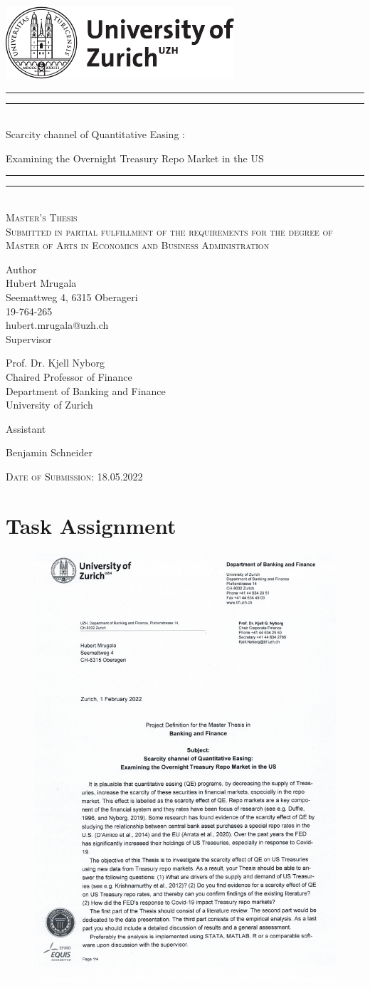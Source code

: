 \documentclass[11pt,a4paper,english,oneside]{book}
\makeatletter
\newcommand*{\plogo}{\includegraphics{./style/uzh_logo_e_pos}}
\numberwithin{equation}{chapter}
\newcommand*{\titleGP}{\begingroup %
\centering %
\vspace*{\baselineskip} %
\plogo\\[2\baselineskip] %
\rule{\textwidth}{1.6pt}\vspace*{-\baselineskip}\vspace*{2pt} %
\rule{\textwidth}{0.4pt}\\[\baselineskip] %
{\LARGE Scarcity channel of Quantitative Easing :}

\vspace*{3pt}

{\LARGE Examining the Overnight Treasury Repo Market in the US}\\[0.2\baselineskip] %
\rule{\textwidth}{0.4pt}\vspace*{-\baselineskip}\vspace{3.2pt} %
\rule{\textwidth}{1.6pt}\\[2\baselineskip] %
\scshape %
Master's Thesis\\[2\baselineskip]
Submitted in partial fulfillment of the requirements for the degree of Master of Arts in Economics and Business Administration \par
\vspace*{2\baselineskip}
Author\\
{\Large Hubert Mrugala \\ [5pt]
 }
Seemattweg 4, 6315 Oberageri \\[5pt]
19-764-265 \\[5pt]
hubert.mrugala@uzh.ch \\


\vspace*{2\baselineskip}
Supervisor\\
{\Large Prof. Dr. Kjell Nyborg\\[5pt]\small Chaired Professor of Finance\\[5pt]
\small Department of Banking and Finance\\[5pt]University of Zurich\par}
\vspace*{2\baselineskip}
Assistant\\
{\Large Benjamin Schneider \par}
\vfill
{\scshape Date of Submission: 18.05.2022} \\[0.3\baselineskip]
\endgroup}
\makeatother
\begin{document}
\thispagestyle{empty}
\titleGP
\newpage
\doublespacing
\setcounter{page}{1}
\section*{Task Assignment}

\begin{figure}[h!]
  \begin{center}
    \includegraphics[page=1,width=.86\textwidth]{../../project_definition.pdf}
  \end{center}
\end{figure}
\newpage
\end{document}
